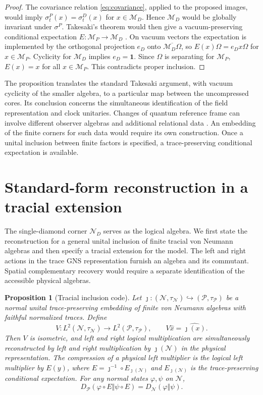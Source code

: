 \documentclass[11pt,a4paper]{article}
\numberwithin{equation}{section}
\newtheorem{proposition}{Proposition}[section]
\theoremstyle{remark}
\newcommand{\M}{\mathcal M}
\newcommand{\N}{\mathcal N}
\newcommand{\Palg}{\mathcal P}
\newcommand{\one}{\mathbf 1}
\begin{document}
\begin{proof}
The covariance relation \eqref{eq:covariance}, applied to the proposed images, would imply
$\sigma_t^P(x)=\sigma_t^D(x)$ for $x\in\M_D$. Hence $\M_D$ would be globally invariant under $\sigma^P$. Takesaki's theorem would then give a vacuum-preserving conditional expectation $E:\M_P\to\M_D$ \cite{Takesaki1972}. On vacuum vectors the expectation is implemented by the orthogonal projection $e_D$ onto $\overline{\M_D\Omega}$, so
$E(x)\Omega=e_Dx\Omega$ for $x\in\M_P$. Cyclicity for $\M_D$ implies $e_D=\one$. Since $\Omega$ is separating for $\M_P$, $E(x)=x$ for all $x\in\M_P$. This contradicts proper inclusion.
\end{proof}

The proposition translates the standard Takesaki argument, with vacuum cyclicity of the smaller algebra, to a particular map between the uncompressed cores. Its conclusion concerns the simultaneous identification of the field representation and clock unitaries. Changes of quantum reference frame can involve different observer algebras and additional relational data \cite{DeVuystEtAl2025}. An embedding of the finite corners for such data would require its own construction. Once a unital inclusion between finite factors is specified, a trace-preserving conditional expectation is available.

\section{Standard-form reconstruction in a tracial extension}
\label{sec:code}

The single-diamond corner $\N_D$ serves as the logical algebra. We first state the reconstruction for a general unital inclusion of finite tracial von Neumann algebras and then specify a tracial extension for the model. The left and right actions in the trace GNS representation furnish an algebra and its commutant. Spatial complementary recovery would require a separate identification of the accessible physical algebras.

\begin{proposition}[Tracial inclusion code]
\label{prop:code}
Let $\jmath:(\N,\tau_{\N})\hookrightarrow(\Palg,\tau_{\Palg})$ be a normal unital trace-preserving embedding of finite von Neumann algebras with faithful normalized traces. Define
\begin{equation}
 V:L^2(\N,\tau_{\N})\longrightarrow L^2(\Palg,\tau_{\Palg}),\qquad
 V\widehat{x}=\widehat{\jmath(x)}.
 \label{eq:V}
\end{equation}
Then $V$ is isometric, and left and right logical multiplication are simultaneously reconstructed by left and right multiplication by $\jmath(\N)$ in the physical representation. The compression of a physical left multiplier is the logical left multiplier by $E(y)$, where
$E=\jmath^{-1}\circ E_{\jmath(\N)}$ and $E_{\jmath(\N)}$ is the trace-preserving conditional expectation. For any normal states $\varphi,\psi$ on $\N$,
\begin{equation}
 D_{\Palg}(\varphi\circ E\Vert\psi\circ E)=D_{\N}(\varphi\Vert\psi).
 \label{eq:pres}
\end{equation}
\end{proposition}
\end{document}
